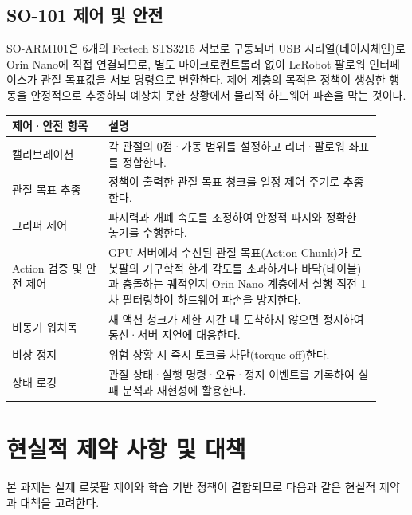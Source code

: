 \documentclass[titlepage]{pnureport}
\begin{document}
\section{SO-101 제어 및 안전}

SO-ARM101은 6개의 Feetech STS3215 서보로 구동되며 USB 시리얼(데이지체인)로 Orin Nano에 직접 연결되므로, 별도 마이크로컨트롤러 없이 LeRobot 팔로워 인터페이스가 관절 목표값을 서보 명령으로 변환한다. 제어 계층의 목적은 정책이 생성한 행동을 안정적으로 추종하되 예상치 못한 상황에서 물리적 하드웨어 파손을 막는 것이다. 

\begin{longtable}{p{0.24\linewidth}p{0.68\linewidth}}
\toprule
제어·안전 항목 & 설명 \\
\midrule
\endhead
캘리브레이션 & 각 관절의 0점·가동 범위를 설정하고 리더·팔로워 좌표를 정합한다. \\
관절 목표 추종 & 정책이 출력한 관절 목표 청크를 일정 제어 주기로 추종한다. \\
그리퍼 제어 & 파지력과 개폐 속도를 조정하여 안정적 파지와 정확한 놓기를 수행한다. \\
Action 검증 및 안전 제어 & GPU 서버에서 수신된 관절 목표(Action Chunk)가 로봇팔의 기구학적 한계 각도를 초과하거나 바닥(테이블)과 충돌하는 궤적인지 Orin Nano 계층에서 실행 직전 1차 필터링하여 하드웨어 파손을 방지한다. \\
비동기 워치독 & 새 액션 청크가 제한 시간 내 도착하지 않으면 정지하여 통신·서버 지연에 대응한다. \\
비상 정지 & 위험 상황 시 즉시 토크를 차단(torque off)한다. \\
상태 로깅 & 관절 상태·실행 명령·오류·정지 이벤트를 기록하여 실패 분석과 재현성에 활용한다. \\
\bottomrule
\end{longtable}

\chapter{현실적 제약 사항 및 대책}

본 과제는 실제 로봇팔 제어와 학습 기반 정책이 결합되므로 다음과 같은 현실적 제약과 대책을 고려한다.
\end{document}
